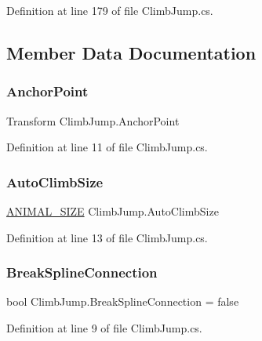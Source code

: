 Definition at line 179 of file Climb\+Jump.\+cs.



\subsection{Member Data Documentation}
\mbox{\label{class_climb_jump_a2c6a0bce88d430514c8edd50faf572a3}} 
\subsubsection{\texorpdfstring{Anchor\+Point}{AnchorPoint}}
{\footnotesize\ttfamily Transform Climb\+Jump.\+Anchor\+Point}



Definition at line 11 of file Climb\+Jump.\+cs.

\mbox{\label{class_climb_jump_ab06506a0317a9830f1dcd7b19a920cc9}} 
\subsubsection{\texorpdfstring{Auto\+Climb\+Size}{AutoClimbSize}}
{\footnotesize\ttfamily \mbox{\hyperlink{_animal_8cs_ad0d15cd79bb3e3a97e7fb817f1438fcc}{A\+N\+I\+M\+A\+L\+\_\+\+S\+I\+ZE}} Climb\+Jump.\+Auto\+Climb\+Size}



Definition at line 13 of file Climb\+Jump.\+cs.

\mbox{\label{class_climb_jump_adf154cf72f285b44e4169ae2c945134b}} 
\subsubsection{\texorpdfstring{Break\+Spline\+Connection}{BreakSplineConnection}}
{\footnotesize\ttfamily bool Climb\+Jump.\+Break\+Spline\+Connection = false}



Definition at line 9 of file Climb\+Jump.\+cs.

